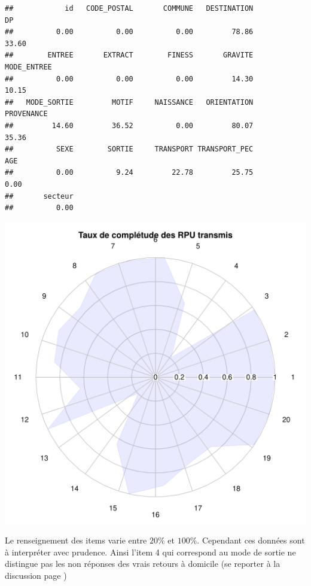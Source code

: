 \documentclass[12pt,english,french,twoside]{report}\usepackage[]{graphicx}\usepackage[]{color}
\makeatletter
\def\maxwidth{ %
  \ifdim\Gin@nat@width>\linewidth
    \linewidth
  \else
    \Gin@nat@width
  \fi
}
\newenvironment{kframe}{%
 \def\at@end@of@kframe{}%
 \ifinner\ifhmode%
  \def\at@end@of@kframe{\end{minipage}}%
  \begin{minipage}{\columnwidth}%
 \fi\fi%
 \def\FrameCommand##1{\hskip\@totalleftmargin \hskip-\fboxsep
 \colorbox{shadecolor}{##1}\hskip-\fboxsep
     \hskip-\linewidth \hskip-\@totalleftmargin \hskip\columnwidth}%
 \MakeFramed {\advance\hsize-\width
   \@totalleftmargin\z@ \linewidth\hsize
   \@setminipage}}%
 {\par\unskip\endMakeFramed%
 \at@end@of@kframe}
\newenvironment{knitrout}{}{} %
\makeatother
\begin{document}
\begin{knitrout}
\color{fgcolor}\begin{kframe}
\begin{verbatim}
##            id   CODE_POSTAL       COMMUNE   DESTINATION            DP 
##          0.00          0.00          0.00         78.86         33.60 
##        ENTREE       EXTRACT        FINESS       GRAVITE   MODE_ENTREE 
##          0.00          0.00          0.00         14.30         10.15 
##   MODE_SORTIE         MOTIF     NAISSANCE   ORIENTATION    PROVENANCE 
##         14.60         36.52          0.00         80.07         35.36 
##          SEXE        SORTIE     TRANSPORT TRANSPORT_PEC           AGE 
##          0.00          9.24         22.78         25.75          0.00 
##       secteur 
##          0.00
\end{verbatim}
\end{kframe}
\includegraphics[width=\maxwidth]{figure/radar} 

\end{knitrout}


Le renseignement des items varie entre $20\%$ et $100\%$. Cependant ces données sont à interpréter avec prudence. Ainsi l'item 4 qui correspond au mode de sortie ne distingue pas les non réponses des vrais retours à domicile (se reporter à la discussion page \pageref{ref:sortie})
\end{document}
